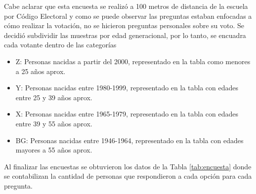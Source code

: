 Cabe aclarar que esta encuesta se realizó a 100 metros de distancia de la escuela por Código Electoral y como se puede observar las preguntas estaban enfocadas a cómo realizar la votación, no se hicieron preguntas personales sobre su voto. Se decidió subdividir las muestras por edad generacional, por lo tanto, se encuadra cada votante dentro de las categorías
\begin{itemize}
    \item Z: Personas nacidas a partir del 2000, representado en la tabla como menores a 25 años aprox.
    \item Y: Personas nacidas entre 1980-1999, representado en la tabla con edades entre 25 y 39 años aprox.
    \item X: Personas nacidas entre 1965-1979, representado en la tabla con edades entre 39 y 55 años aprox.
    \item BG: Personas nacidas entre 1946-1964, representado en la tabla con edades mayores a 55 años aprox.
\end{itemize}
Al finalizar las encuestas se obtuvieron los datos de la Tabla \ref{tab:encuesta} donde se contabilizan la cantidad de personas que respondieron a cada opción para cada pregunta.
